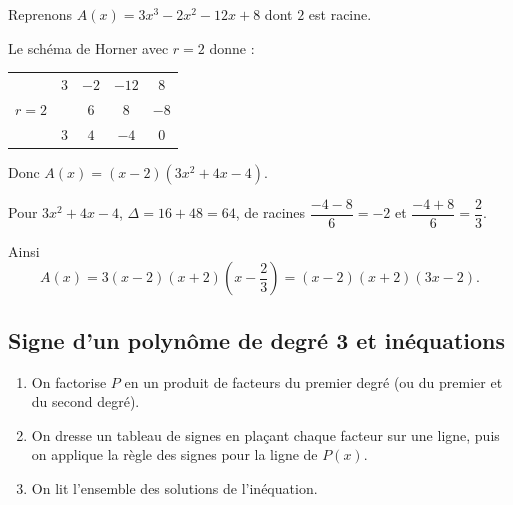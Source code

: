 \begin{ex}
	Reprenons $A(x) = 3x^3 - 2x^2 - 12x + 8$ dont $2$ est racine.

	Le schéma de Horner avec $r = 2$ donne :
	\begin{center}
		\def\arraystretch{1.3}
		\begin{tabular}{c|cccc}
			        & $3$ & $-2$ & $-12$ & $8$  \\
			$r = 2$ &     & $6$  & $8$   & $-8$ \\ \hline
			        & $3$ & $4$  & $-4$  & $0$
		\end{tabular}
	\end{center}
	Donc $A(x) = (x - 2)(3x^2 + 4x - 4)$.

	Pour $3x^2 + 4x - 4$, $\Delta = 16 + 48 = 64$, de racines $\dfrac{-4 - 8}{6} = -2$ et $\dfrac{-4 + 8}{6} = \dfrac{2}{3}$.

	Ainsi
	\[
		A(x) = 3(x - 2)(x + 2)\left(x - \dfrac{2}{3}\right) = (x - 2)(x + 2)(3x - 2).
	\]

	\begin{center}
	\end{center}
\end{ex}

\subsection{Signe d'un polynôme de degré 3 et inéquations}

\begin{methode}
	\nline
	\begin{enumerate}
		\item On factorise $P$ en un produit de facteurs du premier degré (ou du premier et du second degré).
		\item On dresse un tableau de signes en plaçant chaque facteur sur une ligne, puis on applique la règle des signes pour la ligne de $P(x)$.
		\item On lit l'ensemble des solutions de l'inéquation.
	\end{enumerate}
\end{methode}

